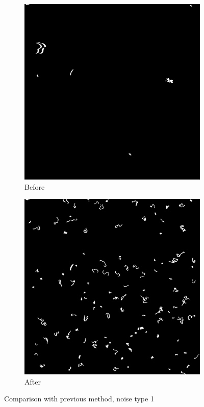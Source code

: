 \begin{figure}[!htbp]
	\begin{subfigure}{0.5\textwidth}
		\includegraphics[width=\linewidth]{before.png}
		\caption{Before}
		\label{fig:bwbefore}
	\end{subfigure}%
	\hspace{\fill}
	\begin{subfigure}{0.5\textwidth}
		\includegraphics[width=\linewidth]{after.png}
		\caption{After}
		\label{fig:bwafter}
	\end{subfigure}%
	\caption{Comparison with previous method, noise type 1}\label{fig:compareThresh}
\end{figure}

